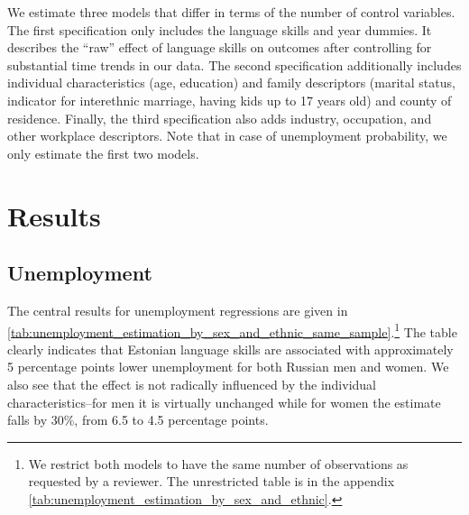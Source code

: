 \documentclass[12pt, a4paper]{article}
\begin{document}
We estimate three models that differ in terms of the number of
control variables. The first specification only includes the language skills
and year dummies.  It describes the ``raw'' effect of language skills
on outcomes after controlling for substantial time trends in our data.
The second specification additionally includes individual
characteristics (age, education) and family descriptors (marital
status, indicator for interethnic marriage, having kids up to 17 years
old) and county of residence.  
Finally, the third specification also adds industry, occupation, and other
workplace descriptors.
Note that in case of unemployment probability,
we only estimate the first two models.


\section{Results}
\label{sec:results}
\subsection{Unemployment}
\label{subsec:basic_model_unemployment}

The central results for unemployment regressions are given in
\cref{tab:unemployment_estimation_by_sex_and_ethnic_same_sample}.\footnote{We
  restrict both models to have the same number of observations as
  requested by a reviewer. The unrestricted table is in the appendix \cref{tab:unemployment_estimation_by_sex_and_ethnic}.}
The
table clearly indicates that Estonian language skills are associated
with approximately 5 percentage points lower unemployment for both
Russian men and women. We also see that the effect is not radically
influenced by the individual characteristics--for men it is
virtually unchanged while for women the estimate falls by 30\%, from
6.5 to 4.5 percentage points.
\end{document}
